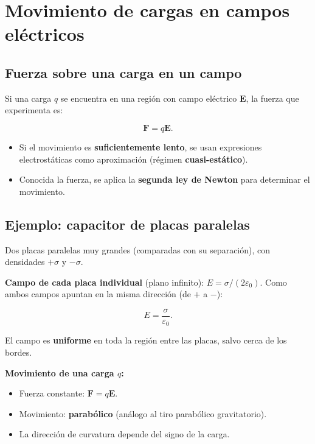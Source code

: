 \documentclass[12pt,a4paper]{article}
\begin{document}
\section{Movimiento de cargas en campos eléctricos}

\subsection{Fuerza sobre una carga en un campo}

Si una carga $q$ se encuentra en una región con campo eléctrico
$\mathbf{E}$, la fuerza que experimenta es:

\[
\boxed{\mathbf{F} = q \mathbf{E}}.
\]

\begin{itemize}[nosep]
  \item Si el movimiento es \textbf{suficientemente lento}, se usan
        expresiones electrostáticas como aproximación (régimen
        \textbf{cuasi-estático}).
  \item Conocida la fuerza, se aplica la \textbf{segunda ley de Newton}
        para determinar el movimiento.
\end{itemize}

\subsection{Ejemplo: capacitor de placas paralelas}

Dos placas paralelas muy grandes (comparadas con su separación), con
densidades $+\sigma$ y $-\sigma$.

\textbf{Campo de cada placa individual} (plano infinito):
$E = \sigma/(2\varepsilon_0)$. Como ambos campos apuntan en la misma
dirección (de $+$ a $-$):

\[
\boxed{E = \frac{\sigma}{\varepsilon_0}}.
\]

El campo es \textbf{uniforme} en toda la región entre las placas,
salvo cerca de los bordes.

\textbf{Movimiento de una carga $q$:}
\begin{itemize}[nosep]
  \item Fuerza constante: $\mathbf{F} = q\mathbf{E}$.
  \item Movimiento: \textbf{parabólico} (análogo al tiro parabólico
        gravitatorio).
  \item La dirección de curvatura depende del signo de la carga.
\end{itemize}
\end{document}
